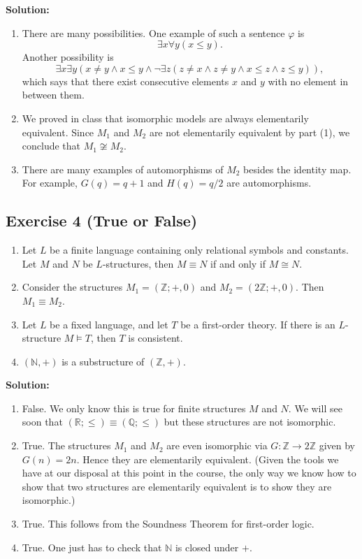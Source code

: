 \documentclass[10pt]{article}
\begin{document}
\textbf{Solution:}
\begin{enumerate}[label=(\arabic*)]
    \item There are many possibilities. One example of such a sentence $\varphi$ is
    \[
    \exists x \forall y (x \leq y).
    \]
    Another possibility is
    \[
    \exists x \exists y (x \neq y \land x \leq y \land \neg \exists z (z \neq x \land z \neq y \land x \leq z \land z \leq y)),
    \]
    which says that there exist consecutive elements $x$ and $y$ with no element in between them.
    \item We proved in class that isomorphic models are always elementarily equivalent. Since $M_1$ and $M_2$ are not elementarily equivalent by part (1), we conclude that $M_1 \not\cong M_2$.
    \item There are many examples of automorphisms of $M_2$ besides the identity map. For example, $G(q) = q + 1$ and $H(q) = q / 2$ are automorphisms.
\end{enumerate}

\subsection*{Exercise 4 (True or False)}
\begin{enumerate}[label=(\arabic*)]
    \item Let $L$ be a finite language containing only relational symbols and constants. Let $M$ and $N$ be $L$-structures, then $M \equiv N$ if and only if $M \cong N$.
    \item Consider the structures $M_1 = (\mathbb{Z}; +, 0)$ and $M_2 = (2\mathbb{Z}; +, 0)$. Then $M_1 \equiv M_2$.
    \item Let $L$ be a fixed language, and let $T$ be a first-order theory. If there is an $L$-structure $M \models T$, then $T$ is consistent.
    \item $(\mathbb{N}, +)$ is a substructure of $(\mathbb{Z}, +)$.
\end{enumerate}

\textbf{Solution:}
\begin{enumerate}[label=(\arabic*)]
    \item False. We only know this is true for finite structures $M$ and $N$. We will see soon that $(\mathbb{R}; \leq) \equiv (\mathbb{Q}; \leq)$ but these structures are not isomorphic.
    \item True. The structures $M_1$ and $M_2$ are even isomorphic via $G : \mathbb{Z} \rightarrow 2\mathbb{Z}$ given by $G(n) = 2n$. Hence they are elementarily equivalent. (Given the tools we have at our disposal at this point in the course, the only way we know how to show that two structures are elementarily equivalent is to show they are isomorphic.)
    \item True. This follows from the Soundness Theorem for first-order logic.
    \item True. One just has to check that $\mathbb{N}$ is closed under $+$.
\end{enumerate}
\end{document}
